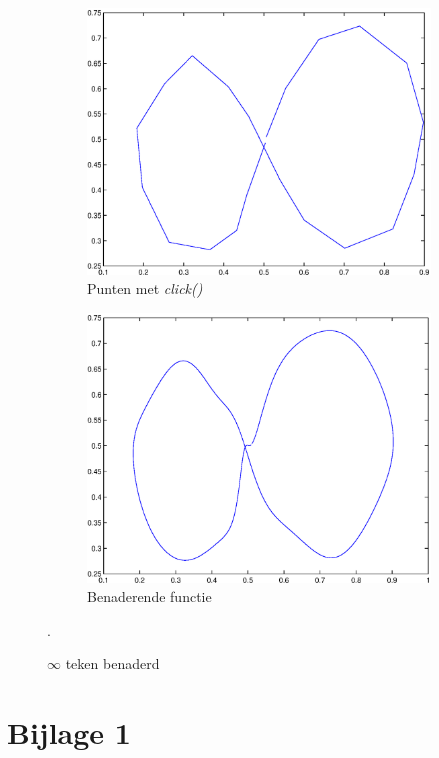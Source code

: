 \documentclass[a4paper]{article}
\begin{document}
\begin{figure}
    \centering
    \begin{subfigure}[b]{0.4\textwidth}
        \centering
        \includegraphics[width=\textwidth]{infclick.eps}
        \caption{Punten met \textit{click()}}
        \label{fig:periotriga}
    \end{subfigure}
    \begin{subfigure}[b]{0.4\textwidth}
        \centering
        \includegraphics[width=\textwidth]{inftrig.eps}
        \caption{Benaderende functie}
        \label{fig:periotrigb}
    \end{subfigure}
    \hfill
    \caption{$\infty$ teken benaderd}\label{fig:periotrigclick}.
\end{figure}
\newpage
\section*{Bijlage 1} 

\label{bijlage1}
\end{document}

